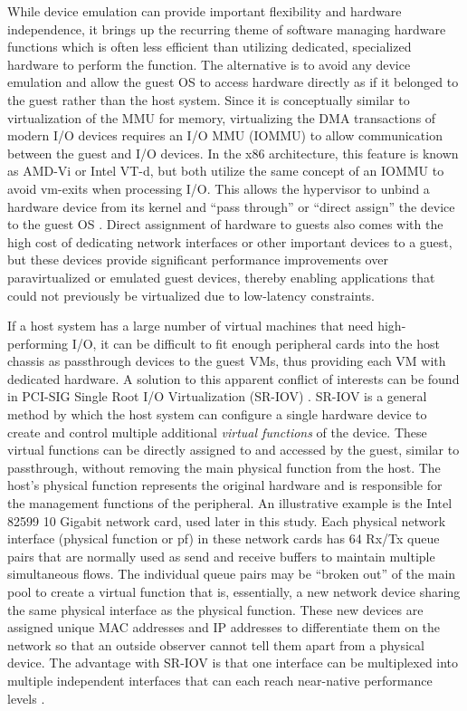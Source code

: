 While device emulation can provide important flexibility and hardware independence, it brings up the recurring theme of software managing hardware functions which is often less efficient than utilizing dedicated, specialized hardware to perform the function.
The alternative is to avoid any device emulation and allow the guest OS to access hardware directly as if it belonged to the guest rather than the host system.
Since it is conceptually similar to virtualization of the MMU for memory, virtualizing the DMA transactions of modern I/O devices requires an I/O MMU (IOMMU) to allow communication between the guest and I/O devices.
In the x86 architecture, this feature is known as AMD-Vi or Intel VT-d, but both utilize the same concept of an IOMMU to avoid vm-exits when processing I/O.
This allows the hypervisor to unbind a hardware device from its kernel and ``pass through'' or ``direct assign'' the device to the guest OS \autocite{_jones_1}.
Direct assignment of hardware to guests also comes with the high cost of dedicating network interfaces or other important devices to a guest, but these devices provide significant performance improvements over paravirtualized or emulated guest devices, thereby enabling applications that could not previously be virtualized due to low-latency constraints.

If a host system has a large number of virtual machines that need high-performing I/O, it can be difficult to fit enough peripheral cards into the host chassis as passthrough devices to the guest VMs, thus providing each VM with dedicated hardware.
A solution to this apparent conflict of interests can be found in PCI-SIG Single Root I/O Virtualization (SR-IOV) \autocite{_pcisig_1, intelvtd}.
SR-IOV is a general method by which the host system can configure a single hardware device to create and control multiple additional \emph{virtual functions} of the device.
These virtual functions can be directly assigned to and accessed by the guest, similar to passthrough, without removing the main physical function from the host.
The host's physical function represents the original hardware and is responsible for the management functions of the peripheral.  
An illustrative example is the Intel 82599 10 Gigabit network card, used later in this study.
Each physical network interface (physical function or pf) in these network cards has 64 Rx/Tx queue pairs that are normally used as send and receive buffers to maintain multiple simultaneous flows.
The individual queue pairs may be ``broken out'' of the main pool to create a virtual function that is, essentially, a new network device sharing the same physical interface as the physical function.
These new devices are assigned unique MAC addresses and IP addresses to differentiate them on the network so that an outside observer cannot tell them apart from a physical device.
The advantage with SR-IOV is that one interface can be multiplexed into multiple independent interfaces that can each reach near-native performance levels \autocite{_nasa_1}.

